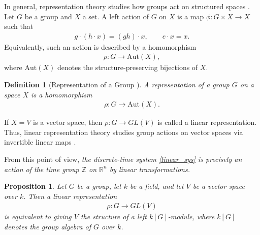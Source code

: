 \documentclass[letterpaper, 9pt, conference]{ieeeconf}
\newtheorem{proposition}[theorem]{Proposition}
\newtheorem{definition}[theorem]{Definition}
\begin{document}
In general, representation theory studies how groups act on structured spaces
\cite{serre_linear_representation_book,lang_algebra_book,rotman_group_theory_book}. Let $G$ be a group and $X$
a set. A left action of $G$ on $X$ is a map $\phi:G\times X\to X$ such that
\begin{eqnarray*}
g\cdot(h\cdot x)=(gh)\cdot x,\qquad e\cdot x=x.
\end{eqnarray*}
Equivalently, such an action is described by a homomorphism
\begin{eqnarray}
\rho:G\to \mathrm{Aut}(X),
\end{eqnarray}
where $\mathrm{Aut}(X)$ denotes the structure-preserving bijections of $X$.

\begin{definition}[Representation of a Group \cite{lang_algebra_book,rotman_group_theory_book}]
A representation of a group $G$ on a space $X$ is a homomorphism
\begin{eqnarray*}
\rho:G\to \mathrm{Aut}(X).
\end{eqnarray*}
\end{definition}

If $X=V$ is a vector space, then $\rho:G\to GL(V)$ is called a linear
representation. Thus, linear representation theory studies group actions on
vector spaces via invertible linear maps
\cite{serre_linear_representation_book,dummit_foote,lang_algebra_book}.

From this point of view, \emph{the discrete-time system \eqref{linear_sys} is
precisely an action of the time group $\mathbb{Z}$ on $\mathbb{R}^n$ by linear
transformations.}

\begin{proposition}\label{prop_group_algebra_module}
Let $G$ be a group, let $k$ be a field, and let $V$ be a vector space over $k$.
Then a linear representation
\begin{eqnarray}
\rho:G \to GL(V)
\end{eqnarray}
is equivalent to giving $V$ the structure of a left $k[G]$-module, where
$k[G]$ denotes the group algebra of $G$ over $k$.
\end{proposition}
\end{document}
